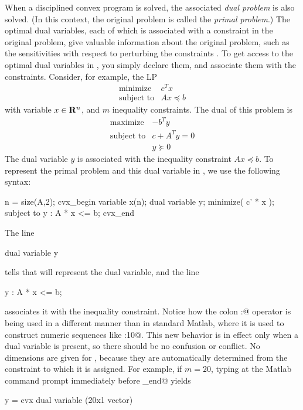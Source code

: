 \documentclass[12pt]{article}
\begin{document}
When a disciplined convex program is solved, the associated 
\emph{dual problem} is also solved.
(In this context, the original problem is called the \emph{primal
problem}.)
The optimal dual variables, each of which is associated with a 
constraint in the original problem,
give valuable information about the original problem,
such as the sensitivities with respect to perturbing the constraints
\cite[Ch.5]{BV:04}.
To get access to the optimal dual variables in \cvx, you 
simply declare them, and associate them with the constraints.
Consider, for example, the LP
\[
\begin{array}{llcll}
\mbox{minimize} & c^Tx \\
\mbox{subject to} & Ax \preceq b
\end{array}
\]
with variable $x\in\mathbf{R}^{n}$, and $m$ inequality constraints.
The dual of this problem is
\[
\begin{array}{llcll}
\mbox{maximize} & - b^T y \\
\mbox{subject to} & c + A^T y = 0 \\ & y \succeq 0
\end{array}
\]
The dual variable $y$ is associated with the inequality
constraint $Ax\preceq b$. To represent the primal problem and 
this dual variable in \cvx, we use the following syntax:
\begin{code}
	n = size(A,2);
	cvx_begin
	    variable x(n);
	    dual variable y;
	    minimize( c' * x );
	    subject to
	        y : A * x <= b;
	cvx_end
\end{code}	
The line 
\begin{code}
	dual variable y
\end{code}
tells \cvx that \verb@y@ will represent the dual variable, and the line
\begin{code}
	y : A * x <= b;
\end{code}
associates it with the inequality constraint. Notice how the
colon \verb@:@ operator is being used in a different manner than 
in standard Matlab, where it is used to construct numeric sequences
like :10@.  This new behavior is in effect only
when a dual variable is present, so there should be no confusion 
or conflict. No dimensions are given
for \verb@y@, because they are automatically determined from the constraint
to which it is assigned. For example, if $m=20$, typing \verb@y@ at
the Matlab command prompt immediately before \verb@cvx_end@ yields
\begin{code}
y =
    cvx dual variable (20x1 vector)
\end{code}
\end{document}
